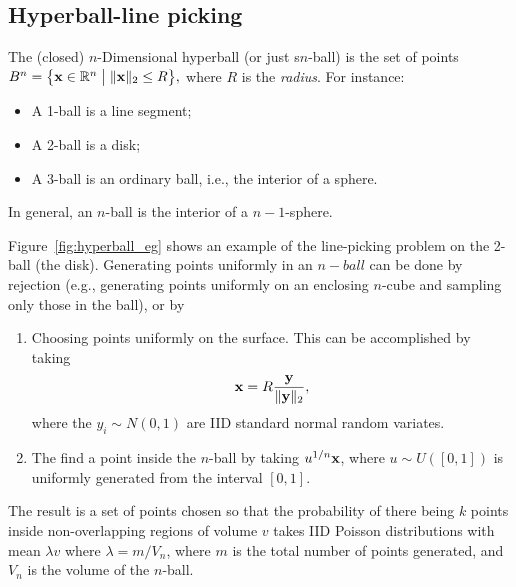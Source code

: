 \subsection{Hyperball-line picking}
\label{sec:hyperball_line}

The (closed) $n$-Dimensional hyperball (or just s$n$-ball) is the set
of points $B^n = \big\{ {\mathbf x} \in \mathbb{R}^n \; \big| \; \|{\mathbf x} \|_2 \leq R
\big\},$ where $R$ is the {\em radius}. For instance:
\begin{itemize}

\item A 1-ball is a line segment;

\item A 2-ball is a disk;

\item A 3-ball is an ordinary ball, i.e., the interior of a sphere.

\end{itemize}
In general, an $n$-ball is the interior of a $n-1$-sphere. 

Figure~\ref{fig:hyperball_eg} shows an example of the line-picking
problem on the 2-ball (the disk). Generating points uniformly in an
$n-ball$ can be done by rejection (e.g., generating points uniformly
on an enclosing $n$-cube and sampling only those in the ball), or by
\begin{enumerate}

\item Choosing points uniformly on the surface. This can be
  accomplished by taking
  \begin{equation}
    \label{eq:x_surface_sphere}
    {\mathbf x} = R \frac{{\mathbf y}}{\| {\mathbf y} \|_2}, 
  \end{equation}
  where the $y_i \sim N(0,1)$ are IID standard normal random variates.

\item The find a point inside the $n$-ball by taking $u^{1/n} {\mathbf x}$,
  where $u \sim U([0,1])$ is uniformly generated from the interval $[0,1]$.

\end{enumerate}
The result is a set of points chosen so that the probability of there
being $k$ points inside non-overlapping regions of volume $v$ takes
IID Poisson distributions with mean $\lambda v$ where $\lambda =
m/V_n$, where $m$ is the total number of points generated, and $V_n$
is the volume of the $n$-ball.


